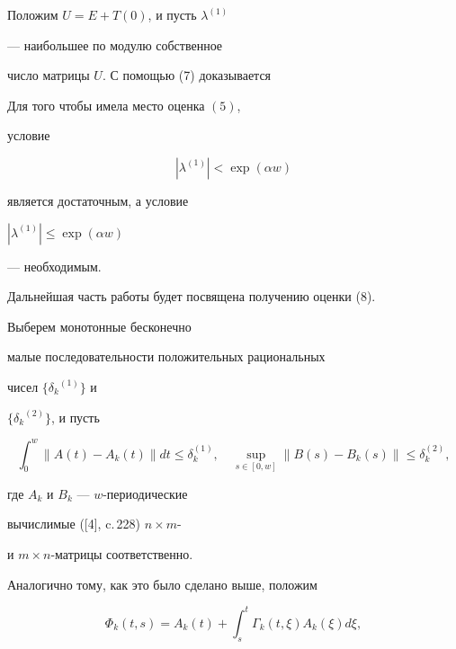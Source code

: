 Положим $U=E+T(0)$, и пусть $\lambda^{(1)}$


--- наибольшее по модулю собственное


число матрицы $U$. С помощью (7) доказывается





\begin{thm}


Для того чтобы имела место оценка $(5)$,


условие


\begin{equation}


|\lambda^{(1)}|<\exp(\alpha w)


\end{equation}


является достаточным, а условие


$|\lambda^{(1)}|\le\exp(\alpha w)$


--- необходимым.


\end{thm}





Дальнейшая часть работы будет посвящена получению оценки (8).





Выберем монотонные бесконечно


малые последовательности положительных рациональных


чисел $\{{\delta_k}^{(1)}\}$ и


$\{{\delta_k}^{(2)}\}$, и пусть


\begin{equation}


\int_0^w\|A(t)-A_k(t)\|dt\le\delta_k^{(1)}, \quad


\sup_{s\in[0,w]}\|B(s)-B_k(s)\|\le\delta_k^{(2)},


\end{equation}


где $A_k$ и $B_k$ --- $w$-периодические


вычислимые ([4], c.\,228) $n\times m$-


и $m\times n$-матрицы соответственно.


Аналогично тому, как это было сделано выше, положим


\begin{equation}


\Phi_k(t,s)=A_k(t)+\int_s^t\Gamma_k(t,\xi)A_k(\xi)d\xi,


\end{equation}


